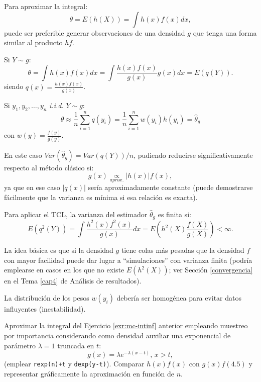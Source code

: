 \documentclass[
]{book}
\theoremstyle{break}
\theoremstyle{definition}
\theoremstyle{definition}
\theoremstyle{definition}
\theoremstyle{remark}
\let\BeginKnitrBlock\begin \let\EndKnitrBlock\end
\begin{document}
Para aproximar la integral:
\[\theta = E\left( h\left( X\right) \right) = \int h\left( x\right) f(x)dx,\]
puede ser preferible generar observaciones de una densidad \(g\)
que tenga una forma similar al producto \(hf\).

Si \(Y\sim g\):
\[\theta  = \int h\left( x\right) f(x)dx 
 = \int \frac{h\left( x\right) f(x)}{g(x)}g(x)dx
 = E\left( q\left( Y\right) \right).\]
siendo
\(q\left( x\right) = \frac{h\left( x\right) f(x)}{g(x)}\).

Si \(y_1,y_2,\ldots ,y_n\) \emph{i.i.d.} \(Y\sim g\):
\[\theta \approx \frac{1}{n}\sum\limits_{i=1}^nq\left( y_i\right) 
= \frac{1}{n}\sum\limits_{i=1}^nw(y_i)h\left( y_i\right)  
= \hat{\theta}_{g}\]
con \(w(y) = \frac{f(y)}{g(y)}\).

En este caso \(Var(\hat{\theta}_{g}) = Var\left( q\left( Y\right) \right) /n\),
pudiendo reducirse significativamente respecto al método clásico si:
\[g(x)\underset{aprox.}{\propto } \left\vert h(x) \right\vert f(x),\]
ya que en ese caso \(\left\vert q(x) \right\vert\) sería aproximadamente constante
(puede demostrarse fácilmente que la varianza es mínima si esa relación es exacta).

Para aplicar el TCL, la varianza del estimador \(\hat{\theta}_{g}\)
es finita si:
\[E\left( q^2\left( Y\right) \right)  
= \int \frac{h^2\left( x\right)f^2(x)}{g(x)}dx 
= E\left( h^2\left( X\right) \frac{f(X)}{g(X)}\right)
< \infty.\]

La idea básica es que si la densidad \(g\) tiene colas más pesadas que
la densidad \(f\) con mayor facilidad puede dar lugar a
``simulaciones'' con varianza finita
(podría emplearse en casos en los que no existe
\(E \left( h^2 \left( X \right) \right)\);
ver Sección \ref{convergencia} en el Tema \ref{cap4} de Análisis de resultados).

La distribución de los pesos \(w(y_i)\) debería ser homogénea para
evitar datos influyentes (inestabilidad).

\BeginKnitrBlock{exercise}
\protect\hypertarget{exr:mc-imp}{}{\label{exr:mc-imp} }
\EndKnitrBlock{exercise}

Aproximar la integral del Ejercicio \ref{exr:mc-intinf} anterior empleando muestreo por importancia considerando como densidad auxiliar una exponencial de parámetro \(\lambda=1\) truncada en \(t\):
\[g\left(  x\right)  =\lambda e^{-\lambda\left(  x-t\right)  }\text{, }x>t,\]
(emplear \texttt{rexp(n)+t} y \texttt{dexp(y-t)}).
Comparar \(h(x)f(x)\) con \(g(x)f(4.5)\) y representar gráficamente la
aproximación en función de \(n\).
\end{document}
